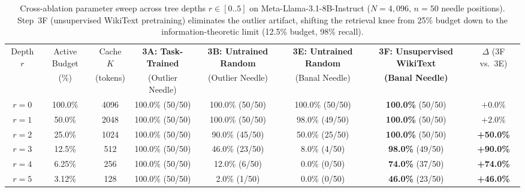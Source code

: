 \documentclass[11pt,a4paper]{article}
\begin{document}
\begin{table}[t]
\centering
\small
\caption{Cross-ablation parameter sweep across tree depths $r \in [0..5]$ on Meta-Llama-3.1-8B-Instruct ($N=4{,}096$, $n=50$ needle positions). Step~3F (unsupervised WikiText pretraining) eliminates the outlier artifact, shifting the retrieval knee from 25\% budget down to the information-theoretic limit (12.5\% budget, 98\% recall).}
\label{tab:comprehensive_niah}
\begin{tabular}{@{}cccccccc@{}}
\toprule
Depth $r$ & Active Budget & Cache $K$ & \textbf{3A: Task-Trained} & \textbf{3B: Untrained Random} & \textbf{3E: Untrained Random} & \textbf{3F: Unsupervised WikiText} & $\Delta$ (3F vs.\ 3E) \\
& (\%) & (tokens) & (Outlier Needle) & (Outlier Needle) & (Banal Needle) & \textbf{(Banal Needle)} & \\
\midrule
$r=0$ & 100.0\% & 4096 & 100.0\% (50/50) & 100.0\% (50/50) & 100.0\% (50/50) & \textbf{100.0\%} (50/50) & $+0.0\%$ \\
$r=1$ & 50.0\%  & 2048 & 100.0\% (50/50) & 100.0\% (50/50) & 98.0\% (49/50)  & \textbf{100.0\%} (50/50) & $+2.0\%$ \\
$r=2$ & 25.0\%  & 1024 & 100.0\% (50/50) & 90.0\% (45/50)  & 50.0\% (25/50)  & \textbf{100.0\%} (50/50) & \textbf{+50.0\%} \\
$r=3$ & 12.5\%  & 512  & 100.0\% (50/50) & 46.0\% (23/50)  & 8.0\% (4/50)    & \textbf{98.0\%} (49/50)  & \textbf{+90.0\%} \\
$r=4$ & 6.25\%  & 256  & 100.0\% (50/50) & 12.0\% (6/50)   & 0.0\% (0/50)    & \textbf{74.0\%} (37/50)  & \textbf{+74.0\%} \\
$r=5$ & 3.12\%  & 128  & 100.0\% (50/50) & 2.0\% (1/50)    & 0.0\% (0/50)    & \textbf{46.0\%} (23/50)  & \textbf{+46.0\%} \\
\bottomrule
\end{tabular}
\end{table}
\end{document}
